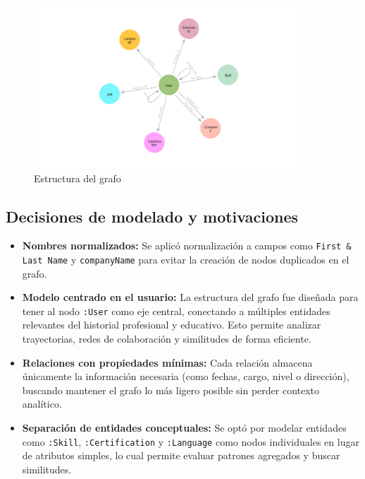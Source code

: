 \documentclass[10pt]{article}
\begin{document}
\begin{figure}[H]
	\centering
	\includegraphics[width=0.9\textwidth]{images/schema.png}
	\caption{Estructura del grafo}
\end{figure}

\subsection*{Decisiones de modelado y motivaciones}

\begin{itemize}
	\item \textbf{Nombres normalizados:}
	      Se aplicó normalización a campos como \texttt{First \& Last Name} y \texttt{companyName} para evitar la creación de nodos duplicados en el grafo.
	      
	\item \textbf{Modelo centrado en el usuario:}
	      La estructura del grafo fue diseñada para tener al nodo \texttt{:User} como eje central, conectando a múltiples entidades relevantes del historial profesional y educativo. Esto permite analizar trayectorias, redes de colaboración y similitudes de forma eficiente.
	      
	\item \textbf{Relaciones con propiedades mínimas:}
	      Cada relación almacena únicamente la información necesaria (como fechas, cargo, nivel o dirección), buscando mantener el grafo lo más ligero posible sin perder contexto analítico.
	      
	\item \textbf{Separación de entidades conceptuales:}
	      Se optó por modelar entidades como \texttt{:Skill}, \texttt{:Certification} y \texttt{:Language} como nodos individuales en lugar de atributos simples, lo cual permite evaluar patrones agregados y buscar similitudes.
\end{itemize}
\end{document}
